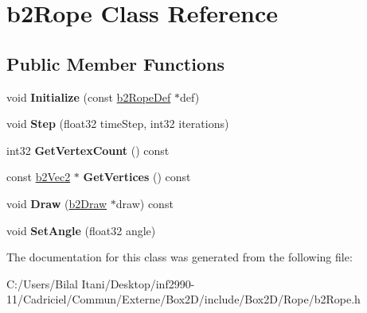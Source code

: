 \hypertarget{classb2_rope}{}\section{b2\+Rope Class Reference}
\label{classb2_rope}
\subsection*{Public Member Functions}
\begin{DoxyCompactItemize}
\item 
void {\bfseries Initialize} (const \hyperlink{structb2_rope_def}{b2\+Rope\+Def} $\ast$def)\hypertarget{classb2_rope_a2a672ca3310790f4af1beb123e597d70}{}\label{classb2_rope_a2a672ca3310790f4af1beb123e597d70}

\item 
void {\bfseries Step} (float32 time\+Step, int32 iterations)\hypertarget{classb2_rope_abe9ce398cef717b136645cbc37f38d70}{}\label{classb2_rope_abe9ce398cef717b136645cbc37f38d70}

\item 
int32 {\bfseries Get\+Vertex\+Count} () const \hypertarget{classb2_rope_aa002b5f7efd152770803aade884f2c75}{}\label{classb2_rope_aa002b5f7efd152770803aade884f2c75}

\item 
const \hyperlink{structb2_vec2}{b2\+Vec2} $\ast$ {\bfseries Get\+Vertices} () const \hypertarget{classb2_rope_a9f5c76a25e44baa702d2a6beef9f2f9c}{}\label{classb2_rope_a9f5c76a25e44baa702d2a6beef9f2f9c}

\item 
void {\bfseries Draw} (\hyperlink{classb2_draw}{b2\+Draw} $\ast$draw) const \hypertarget{classb2_rope_acefc7b4d53ba675fc08700f39d121ec3}{}\label{classb2_rope_acefc7b4d53ba675fc08700f39d121ec3}

\item 
void {\bfseries Set\+Angle} (float32 angle)\hypertarget{classb2_rope_a8a1717a5e0b2c54d56fe438c8cae43b7}{}\label{classb2_rope_a8a1717a5e0b2c54d56fe438c8cae43b7}

\end{DoxyCompactItemize}


The documentation for this class was generated from the following file\+:\begin{DoxyCompactItemize}
\item 
C\+:/\+Users/\+Bilal Itani/\+Desktop/inf2990-\/11/\+Cadriciel/\+Commun/\+Externe/\+Box2\+D/include/\+Box2\+D/\+Rope/b2\+Rope.\+h\end{DoxyCompactItemize}
